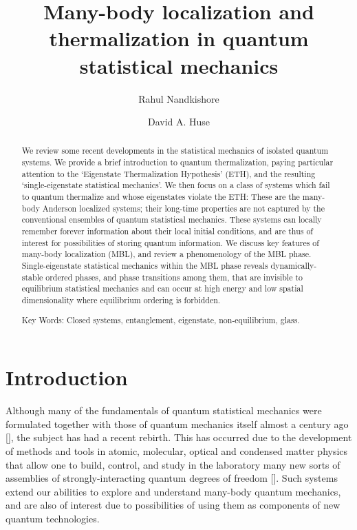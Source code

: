 \documentclass[amsmath,onecolumn, superscriptaddress,preprint,aps]{revtex4}
\renewcommand{\cite}[1]{[\onlinecite{#1}]}
\begin{document}
\title{Many-body localization and thermalization in quantum statistical mechanics}
\author{Rahul Nandkishore}
\author{David A. Huse}
\begin{abstract}
We review some recent developments in the statistical mechanics of isolated quantum systems.  We provide a brief introduction to quantum thermalization,
paying particular attention to the `Eigenstate Thermalization Hypothesis' (ETH), and the resulting `single-eigenstate statistical mechanics'.
We then focus on a class of systems which fail to quantum thermalize and whose eigenstates violate the ETH:  These are the many-body Anderson localized systems;
their long-time properties are not captured by the conventional ensembles of quantum statistical mechanics.  These systems can locally remember forever information
about their local initial conditions, and are thus of interest for possibilities of storing quantum information.  We discuss key features of many-body
localization (MBL), and review a phenomenology of the MBL phase.  Single-eigenstate statistical mechanics within the MBL phase reveals dynamically-stable
ordered phases, and phase transitions among them, that are invisible to equilibrium statistical mechanics and can occur at high energy and low spatial dimensionality
where equilibrium ordering is forbidden.

Key Words: Closed systems, entanglement, eigenstate, non-equilibrium, glass.
\end{abstract}
\maketitle
 \tableofcontents
 \newpage
 \section{Introduction}

Although many of the fundamentals of quantum statistical mechanics were formulated together with those of quantum mechanics itself almost a century ago \cite{sakurai}, the subject has had a recent rebirth.  This has occurred due to the development of methods and tools in atomic, molecular, optical and condensed matter physics that allow one to build, control, and study in the laboratory many new sorts of assemblies of strongly-interacting quantum degrees of freedom \cite{npi}.  Such systems extend our abilities to explore and understand many-body quantum mechanics, and are also of interest due to possibilities of using them as components of new quantum technologies.
\end{document}

